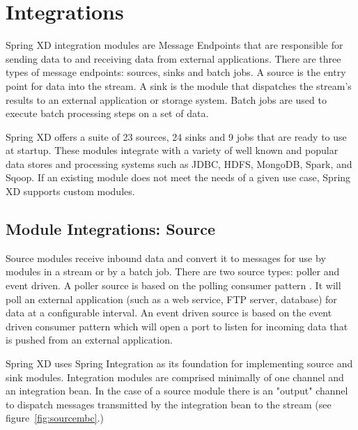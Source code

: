\section{Integrations}
Spring XD integration modules are Message Endpoints \cite{enterprise-integration-pattern-message-endpoint} 
that are responsible for sending data to and receiving data from external applications.
There are three types of message endpoints: sources, sinks and batch jobs.
A source is the entry point for data into the stream. A sink is the module that dispatches
the stream's results to an external application or storage system. Batch jobs are used to
execute batch processing steps on a set of data.

\par

Spring XD offers a suite of 23 sources, 24 sinks and 9 jobs that are ready to use at startup.
These modules integrate with a variety of well known and popular data stores
and processing systems such as JDBC, HDFS, MongoDB, Spark, and Sqoop.
If an existing module does not meet the needs of a given use case, Spring XD supports custom
modules.

\par

\subsection{Module Integrations: Source}
Source modules receive inbound data and convert it to messages for
use by modules in a stream or by a batch job.
There are two source types: poller and event driven.  A poller source is based on the polling
consumer pattern \cite{enterprise-integration-pattern-pollingconsumer}. It
will poll an external application (such as a web service, FTP server, database) for data at a
configurable interval. An event driven source is based on the event driven
consumer pattern \cite{enterprise-integration-pattern-eventdrivenconsumer} which will
open a port to listen for incoming data that is pushed from an external application.

\par

Spring XD uses Spring Integration \cite{spring-integration-reference} as its foundation
for implementing source and sink modules. Integration modules are
comprised minimally of one channel and an integration bean.  In the case of a source module
there is an "output" channel to dispatch messages transmitted by the integration bean to
the stream (see figure~\ref{fig:sourcembc}.)

